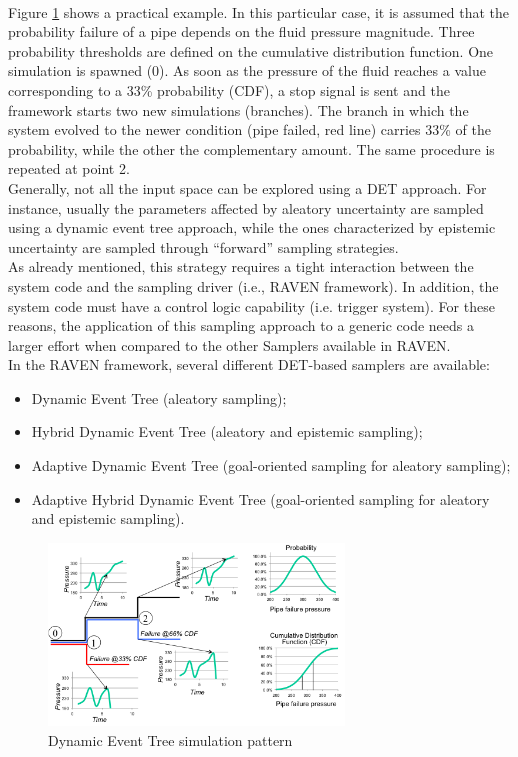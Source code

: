 \\Figure \ref{fig:DETschemeExample} shows a practical example. In this particular case, it is assumed that the
probability failure of a pipe depends on the fluid pressure magnitude. Three probability thresholds are defined on
the cumulative distribution function. One simulation is spawned (0). As soon as the pressure of the fluid reaches a
value corresponding to a 33\% probability (CDF), a stop signal is sent and the framework starts two new
simulations (branches). The branch in which the system evolved to the newer condition (pipe failed, red line)
carries 33\% of the probability, while the other the complementary amount. The same procedure is repeated at
point 2.
\\Generally, not all the input space can be explored using a DET approach. For instance, usually the parameters affected 
by aleatory uncertainty are sampled using a dynamic event tree approach, while the ones characterized by epistemic 
uncertainty are sampled through ``forward'' sampling strategies.
\\As already mentioned, this strategy requires a tight interaction between the system code and the sampling driver (i.e., 
RAVEN framework). In addition, the system code must have a control logic capability (i.e. trigger system). For these 
reasons, the application of this sampling approach to a generic code needs a larger effort when compared to the other 
Samplers available in RAVEN.
\\In the RAVEN framework, several different DET-based samplers are available:
\begin{itemize}
\item Dynamic Event Tree (aleatory sampling);
\item Hybrid Dynamic Event Tree (aleatory and epistemic sampling);
\item Adaptive Dynamic Event Tree (goal-oriented sampling for aleatory sampling);
\item Adaptive Hybrid Dynamic Event Tree (goal-oriented sampling for aleatory and epistemic sampling).
\end{itemize}

\begin{figure}
  \centering
  \includegraphics[width=0.7\textwidth]  {pics/DETscheme.png}
  \caption{Dynamic Event Tree simulation pattern}
  \label{fig:DETschemeExample}
\end{figure}


